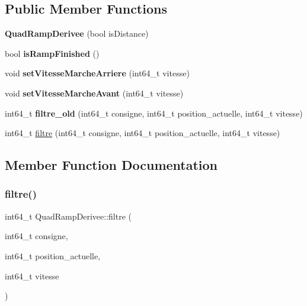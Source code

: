 \subsection*{Public Member Functions}
\begin{DoxyCompactItemize}
\item 
\mbox{\label{classQuadRampDerivee_ac7357f26608a18ad04cfd30b0b5df4d0}} 
{\bfseries Quad\+Ramp\+Derivee} (bool is\+Distance)
\item 
\mbox{\label{classQuadRampDerivee_a009b8c2873b1f879112f44b42d0ad5a4}} 
bool {\bfseries is\+Ramp\+Finished} ()
\item 
\mbox{\label{classQuadRampDerivee_a3ff2140bd9fdde67f183d9c287ac8dfe}} 
void {\bfseries set\+Vitesse\+Marche\+Arriere} (int64\+\_\+t vitesse)
\item 
\mbox{\label{classQuadRampDerivee_a93bcf8fec5db6b43f4c2237c5d06c7ac}} 
void {\bfseries set\+Vitesse\+Marche\+Avant} (int64\+\_\+t vitesse)
\item 
\mbox{\label{classQuadRampDerivee_a45473d7e987261cc063e4eaf720e0754}} 
int64\+\_\+t {\bfseries filtre\+\_\+old} (int64\+\_\+t consigne, int64\+\_\+t position\+\_\+actuelle, int64\+\_\+t vitesse)
\item 
int64\+\_\+t \hyperlink{classQuadRampDerivee_a2c380e34be56a518ccbf3775eabb8d4a}{filtre} (int64\+\_\+t consigne, int64\+\_\+t position\+\_\+actuelle, int64\+\_\+t vitesse)
\end{DoxyCompactItemize}


\subsection{Member Function Documentation}
\mbox{\label{classQuadRampDerivee_a2c380e34be56a518ccbf3775eabb8d4a}} 
\subsubsection{\texorpdfstring{filtre()}{filtre()}}
{\footnotesize\ttfamily int64\+\_\+t Quad\+Ramp\+Derivee\+::filtre (\begin{DoxyParamCaption}\item[{int64\+\_\+t}]{consigne,  }\item[{int64\+\_\+t}]{position\+\_\+actuelle,  }\item[{int64\+\_\+t}]{vitesse }\end{DoxyParamCaption})}

